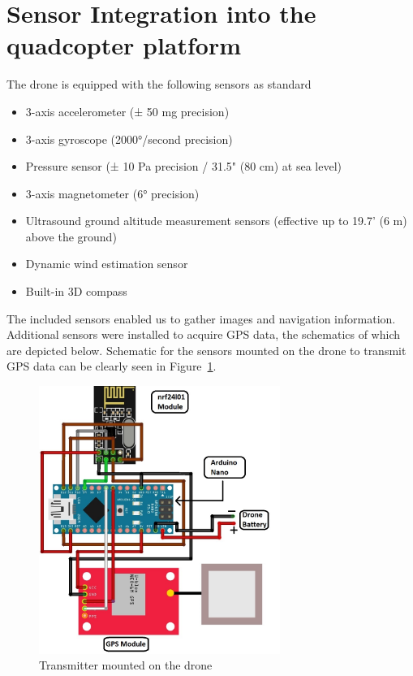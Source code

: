 \documentclass[
  journal=largetwo,
  manuscript=article-type,
  year=2023,
  volume=1,
]{iitp-journal}
\begin{document}
\section{Sensor Integration into the quadcopter platform}
The drone is equipped with the following sensors as standard
\begin{itemize}
    \item 3-axis accelerometer (± 50 mg precision)
    \item 3-axis gyroscope (2000°/second precision)
    \item Pressure sensor (± 10 Pa precision / 31.5" (80 cm) at sea level)
    \item 3-axis magnetometer (6° precision)
    \item Ultrasound ground altitude measurement sensors (effective up to 19.7' (6 m) above the ground)
    \item Dynamic wind estimation sensor
    \item Built-in 3D compass
\end{itemize}
The included sensors enabled us to gather images and navigation information. Additional sensors were installed to acquire GPS data, the schematics of which are depicted below. Schematic for the sensors mounted on the drone to transmit GPS data can be clearly seen in Figure~\ref{fig:transmitter}. 
\begin{figure}
    \centering
    \includegraphics[width=0.7\textwidth]{Transmitter_circuit.jpg}
    \caption{Transmitter mounted on the drone}
    \label{fig:transmitter}
\end{figure}
\\
\end{document}
